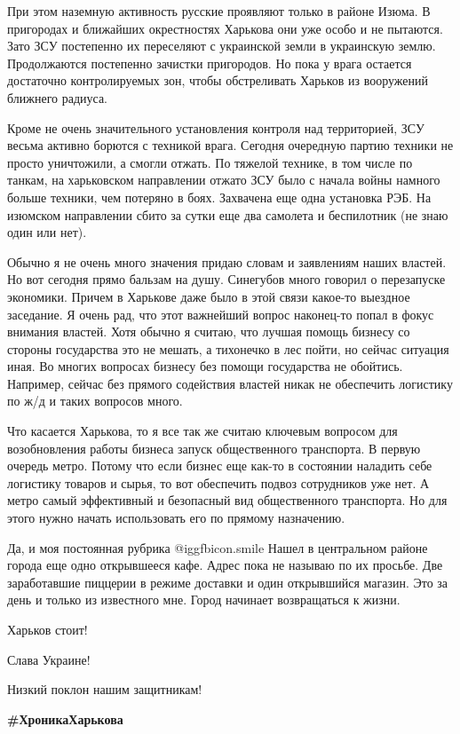 При этом наземную активность русские проявляют только в районе Изюма. В
пригородах и ближайших окрестностях Харькова они уже особо и не пытаются. Зато
ЗСУ постепенно их переселяют с украинской земли в украинскую землю.
Продолжаются постепенно зачистки пригородов. Но пока у врага остается
достаточно контролируемых зон, чтобы обстреливать Харьков из вооружений
ближнего радиуса.

Кроме не очень значительного установления контроля над территорией, ЗСУ весьма
активно борются с техникой врага. Сегодня очередную партию техники не просто
уничтожили, а смогли отжать. По тяжелой технике, в том числе по танкам, на
харьковском направлении отжато ЗСУ было с начала войны намного больше техники,
чем потеряно в боях. Захвачена еще одна установка РЭБ. На изюмском направлении
сбито за сутки еще два самолета и беспилотник (не знаю один или нет).

Обычно я не очень много значения придаю словам и заявлениям наших властей. Но
вот сегодня прямо бальзам на душу. Синегубов много говорил о перезапуске
экономики. Причем в Харькове даже было в этой связи какое-то выездное
заседание. Я очень рад, что этот важнейший вопрос наконец-то попал в фокус
внимания властей. Хотя обычно я считаю, что лучшая помощь бизнесу со стороны
государства это не мешать, а тихонечко в лес пойти, но сейчас ситуация иная. Во
многих вопросах бизнесу без помощи государства не обойтись. Например, сейчас
без прямого содействия властей никак не обеспечить логистику по ж/д и таких
вопросов много.

Что касается Харькова, то я все так же считаю ключевым вопросом для
возобновления работы бизнеса запуск общественного транспорта. В первую очередь
метро. Потому что если бизнес еще как-то в состоянии наладить себе логистику
товаров и сырья, то вот обеспечить подвоз сотрудников уже нет. А метро самый
эффективный и безопасный вид общественного транспорта. Но для этого нужно
начать использовать его по прямому назначению. 

Да, и моя постоянная рубрика  @igg{fbicon.smile}  Нашел в центральном районе
города еще одно открывшееся кафе. Адрес пока не называю по их просьбе. Две
заработавшие пиццерии в режиме доставки и один открывшийся магазин. Это за день
и только из известного мне. Город начинает возвращаться к жизни.

Харьков стоит!

Слава Украине!

Низкий поклон нашим защитникам!

\textbf{\#ХроникаХарькова}

